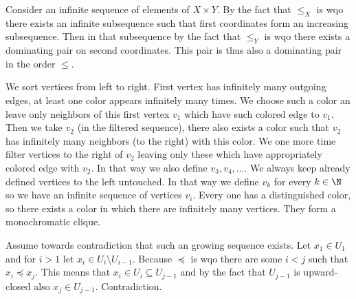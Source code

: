 {
Consider an infinite sequence of elements of $X \times Y$.
By the fact that $\leq_X$ is wqo there exists an infinite subsequence such that
first coordinates form an increasing subsequence. Then in that subsequence by the fact
that $\leq_Y$ is wqo there exists a dominating pair on second coordinates. This pair
is thus also a dominating pair in the order $\leq$.
}





{
We sort vertices from left to right. First vertex has infinitely many outgoing edges, at least one color appears infinitely
many times. We choose such a color an leave only neighbors of this first vertex $v_1$ which have such colored edge
to $v_1$. Then we take $v_2$ (in the filtered sequence), there also exists a color such that $v_2$ has infinitely many
neighbors (to the right) with this color. We one more time filter vertices to the right of $v_2$
leaving only these which have appropriately colored edge with $v_2$.
In that way we also define $v_3, v_4, \ldots$. We always keep already defined vertices to the left untouched.
In that way we define $v_k$ for every $k \in \N$ so we have an infinite sequence of vertices $v_i$.
Every one has a distinguished color, so there exists a color in which there are infinitely many vertices.
They form a monochromatic clique.
}



{
Assume towards contradiction that such an growing sequence exists.
Let $x_1 \in U_1$ and for $i > 1$ let $x_i \in U_i \setminus U_{i-1}$.
Because $\preceq$ is wqo there are some $i < j$ such that $x_i \preceq x_j$.
This means that $x_i \in U_i \subseteq U_{j-1}$ and by the fact that $U_{j-1}$ is upward-closed also $x_j \in U_{j-1}$.
Contradiction.
}


{

}






